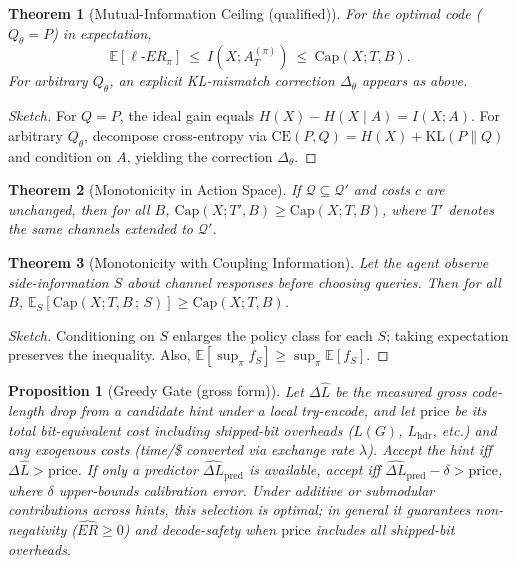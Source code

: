 \documentclass[12pt,a4paper]{article}
\newtheorem{theorem}{Theorem}
\newtheorem{proposition}{Proposition}
\newcommand{\E}{\mathbb{E}}
\newcommand{\ERideal}{\ell\text{-}ER}
\begin{document}
\begin{theorem}[Mutual-Information Ceiling (qualified)]
\label{thm:mi}
For the optimal code ($Q_\theta=P$) in expectation,
\[
\E[\ERideal_\pi]\ \le\ I(X;A_T^{(\pi)})\ \le\ \mathrm{Cap}(X;T,B).
\]
For arbitrary $Q_\theta$, an explicit KL-mismatch correction $\Delta_\theta$ appears as above.
\end{theorem}
\begin{proof}[Sketch]
For $Q=P$, the ideal gain equals $H(X)-H(X\mid A)=I(X;A)$. For arbitrary $Q_\theta$, decompose cross-entropy via $\mathrm{CE}(P,Q)=H(X)+\mathrm{KL}(P\|Q)$ and condition on $A$, yielding the correction $\Delta_\theta$.
\end{proof}

\begin{theorem}[Monotonicity in Action Space]
\label{thm:monotone-q}
If $\mathcal{Q}\subseteq\mathcal{Q}'$ and costs $c$ are unchanged, then for all $B$,
$\mathrm{Cap}(X;T',B)\ge \mathrm{Cap}(X;T,B)$,
where $T'$ denotes the same channels extended to $\mathcal{Q}'$.
\end{theorem}

\begin{theorem}[Monotonicity with Coupling Information]
\label{thm:monotone-s}
Let the agent observe side-information $S$ about channel responses before choosing queries. Then for all $B$,
$\mathbb{E}_S[\mathrm{Cap}(X;T,B\,;\,S)]\ge \mathrm{Cap}(X;T,B)$.
\end{theorem}
\begin{proof}[Sketch]
Conditioning on $S$ enlarges the policy class for each $S$; taking expectation preserves the inequality. Also, $\mathbb{E}[\sup_\pi f_S]\ge \sup_\pi \mathbb{E}[f_S]$.
\end{proof}

\begin{proposition}[Greedy Gate (gross form)]
\label{prop:greedy}
Let $\Delta\widehat{L}$ be the \emph{measured} gross code-length drop from a candidate hint under a local try-encode, and let $\mathrm{price}$ be its total bit-equivalent cost including shipped-bit overheads ($L(G)$, $L_{\mathrm{hdr}}$, etc.) and any exogenous costs (time/\$ converted via exchange rate $\lambda$). Accept the hint iff $\Delta\widehat{L}>\mathrm{price}$. If only a predictor $\widehat{\Delta L}_{\text{pred}}$ is available, accept iff $\widehat{\Delta L}_{\text{pred}}-\delta>\mathrm{price}$, where $\delta$ upper-bounds calibration error. Under additive or submodular contributions across hints, this selection is optimal; in general it guarantees non-negativity ($\widehat{ER}\ge 0$) and decode-safety when $\mathrm{price}$ includes all shipped-bit overheads.
\end{proposition}
\end{document}
